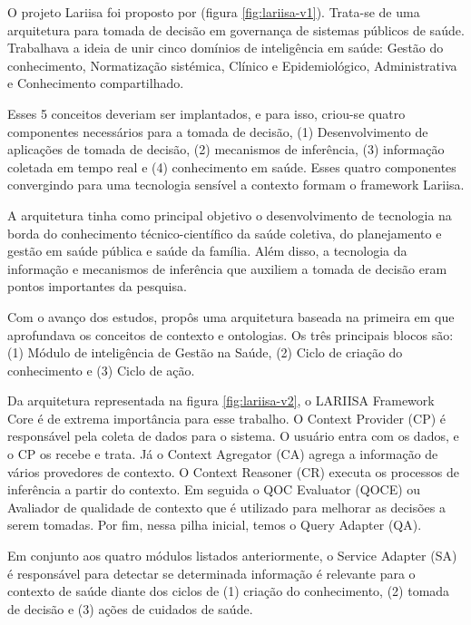 O projeto Lariisa foi proposto por 
(figura \ref{fig:lariisa-v1}). Trata-se de uma arquitetura para tomada de
decisão em governança de sistemas públicos de saúde. Trabalhava a ideia de unir
cinco domínios de inteligência em saúde: Gestão do conhecimento, Normatização
sistémica,  Clínico e Epidemiológico, Administrativa e Conhecimento
compartilhado.

Esses 5 conceitos deveriam ser implantados, e para isso, criou-se quatro
componentes necessários para a tomada de decisão, (1) Desenvolvimento de
aplicações de tomada de decisão, (2) mecanismos de inferência, (3) informação
coletada em tempo real e (4) conhecimento em saúde. Esses quatro componentes
convergindo para uma tecnologia sensível a contexto formam o framework Lariisa.


A arquitetura tinha como principal objetivo o desenvolvimento de tecnologia na
borda do conhecimento técnico-científico da saúde coletiva, do planejamento e
gestão em saúde pública e saúde da família. Além disso, a tecnologia da
informação e mecanismos de inferência que auxiliem a tomada de decisão eram
pontos importantes da pesquisa.

Com o avanço dos estudos,  propôs uma
arquitetura baseada na primeira em que aprofundava os conceitos de contexto e
ontologias. Os três principais blocos são: (1) Módulo de inteligência de Gestão
na Saúde, (2) Ciclo de criação do conhecimento e (3) Ciclo de ação.

Da arquitetura representada na figura \ref{fig:lariisa-v2}, o LARIISA Framework
Core é de extrema importância para esse trabalho. O Context Provider (CP) é
responsável pela coleta de dados para o sistema. O usuário entra com os dados,
e o CP os recebe e trata. Já o Context Agregator (CA) agrega a informação de
vários provedores de contexto. O Context Reasoner (CR) executa os processos de
inferência a partir do contexto. Em seguida o QOC Evaluator (QOCE) ou Avaliador
de qualidade de contexto que é utilizado para melhorar as decisões a serem
tomadas. Por fim, nessa pilha inicial, temos o Query Adapter (QA).

Em conjunto aos quatro módulos listados anteriormente, o Service Adapter (SA) é
responsável para detectar se determinada informação é relevante para o contexto
de saúde diante dos ciclos de (1) criação do conhecimento, (2) tomada de
decisão e (3) ações de cuidados de saúde.

